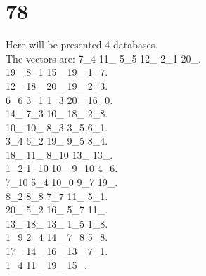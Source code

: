 \chapter{78}
\indent Here will be presented 4 databases.\\
The vectors are:
7\_4 11\_ 5\_5 12\_ 2\_1 20\_.\\19\_ 8\_1 15\_ 19\_ 1\_7.\\12\_ 18\_ 20\_ 19\_ 2\_3.\\6\_6 3\_1 1\_3 20\_ 16\_0.\\14\_ 7\_3 10\_ 18\_ 2\_8.\\10\_ 10\_ 8\_3 3\_5 6\_1.\\3\_4 6\_2 19\_ 9\_5 8\_4.\\18\_ 11\_ 8\_10 13\_ 13\_.\\1\_2 1\_10 10\_ 9\_10 4\_6.\\7\_10 5\_4 10\_0 9\_7 19\_.\\8\_2 8\_8 7\_7 11\_ 5\_1.\\20\_ 5\_2 16\_ 5\_7 11\_.\\13\_ 18\_ 13\_ 1\_5 1\_8.\\1\_9 2\_4 14\_ 7\_8 5\_8.\\17\_ 14\_ 16\_ 13\_ 7\_1.\\1\_4 11\_ 19\_ 15\_.\\